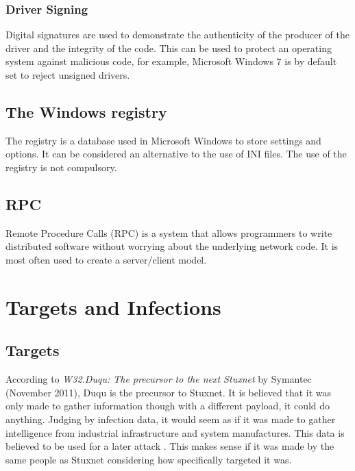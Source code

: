 \documentclass[11pt,english,a4paper]{report}
\begin{document}
\subsection{Driver Signing} \label{DRIVER_SIGN}
Digital signatures are used to demonstrate the authenticity of the producer of the driver and the integrity of the code. This can be used to protect an operating system against malicious code, for example, Microsoft Windows 7 is by default set to reject unsigned drivers.  

\section{The Windows registry}
The registry is a database used in Microsoft Windows to store settings and options. It can be considered an alternative to the use of INI files. The use of the registry is not compulsory.

\section{RPC}
Remote Procedure Calls (RPC) is a system that allows programmers to write distributed software without worrying about the underlying network code. It is most often used to create a server/client model. \cite{MSRPC}

\chapter{Targets and Infections}
\section{Targets}
According to \textit{W32.Duqu: The precursor to the next Stuxnet}\cite{DUQU_SYMANTEC} by Symantec (November 2011), Duqu is the precursor to Stuxnet. It is believed that it was only made to gather information though with a different payload, it could do anything. Judging by infection data, it would seem as if it was made to gather intelligence from industrial infrastructure and system manufactures. This data is believed to be used for a later attack \cite{DUQU_SYMANTEC}. This makes sense if it was made by the same people as Stuxnet considering how specifically targeted it was. 
\end{document}
